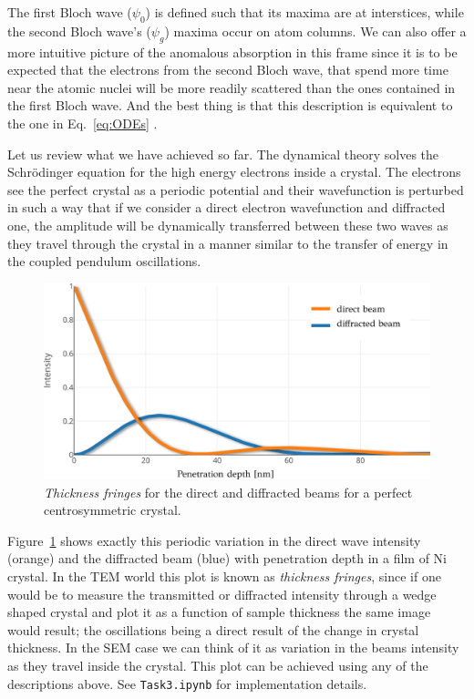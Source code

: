  The first Bloch wave ($\psi_0$) is defined such that its maxima are at interstices, while the second Bloch wave's ($\psi_g$) maxima occur on atom columns. We can also offer a more intuitive picture of the anomalous absorption in this frame since it is to be expected that the electrons from the second Bloch wave, that spend more time near the atomic nuclei will be more readily scattered than the ones contained in the first Bloch wave. And the best thing is that this description is equivalent to the one in Eq.~\ref{eq:ODEs} \cite{electronMicroscopy}.






Let us review what we have achieved so far. The dynamical theory solves the Schr\"{o}dinger equation for the high energy electrons inside a crystal. The electrons see the perfect crystal as a periodic potential and their wavefunction is perturbed in such a way that if we consider a direct electron wavefunction and  diffracted one, the amplitude will be dynamically transferred between these two waves as they travel through the crystal in a manner similar to the transfer of energy in the coupled pendulum oscillations.

\begin{figure}[ht]
    \centering
\includegraphics[width=0.84\linewidth]{Figures/fringes.png}
\caption[Thickness fringes.]{\textit{Thickness fringes} for the direct and diffracted beams for a perfect centrosymmetric crystal.}
\label{Fig:fringes}

\end{figure}


Figure~\ref{Fig:fringes} shows exactly this periodic variation in the direct wave intensity (orange) and the diffracted beam (blue) with penetration depth in a film of Ni crystal. In the TEM world this plot is known as \textit{thickness fringes}, since if one would be to measure the transmitted or diffracted intensity through a wedge shaped crystal and plot it as a function of sample thickness the same image would result; the oscillations being a direct result of the change in crystal thickness. In the SEM case we can think of it as variation in the beams intensity as they travel inside the crystal. This plot can be achieved using any of the descriptions above. See \texttt{Task3.ipynb} for implementation  details.

